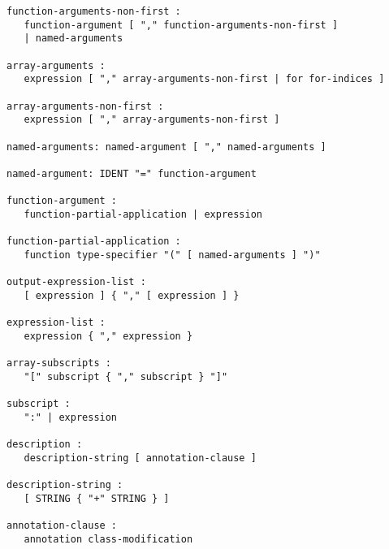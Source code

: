 \begin{lstlisting}[language=grammar]
function-arguments-non-first :
   function-argument [ "," function-arguments-non-first ]
   | named-arguments

array-arguments :
   expression [ "," array-arguments-non-first | for for-indices ]

array-arguments-non-first :
   expression [ "," array-arguments-non-first ]

named-arguments: named-argument [ "," named-arguments ]

named-argument: IDENT "=" function-argument

function-argument :
   function-partial-application | expression

function-partial-application :
   function type-specifier "(" [ named-arguments ] ")"

output-expression-list :
   [ expression ] { "," [ expression ] }

expression-list :
   expression { "," expression }

array-subscripts :
   "[" subscript { "," subscript } "]"

subscript :
   ":" | expression

description :
   description-string [ annotation-clause ]

description-string :
   [ STRING { "+" STRING } ]

annotation-clause :
   annotation class-modification
\end{lstlisting}
